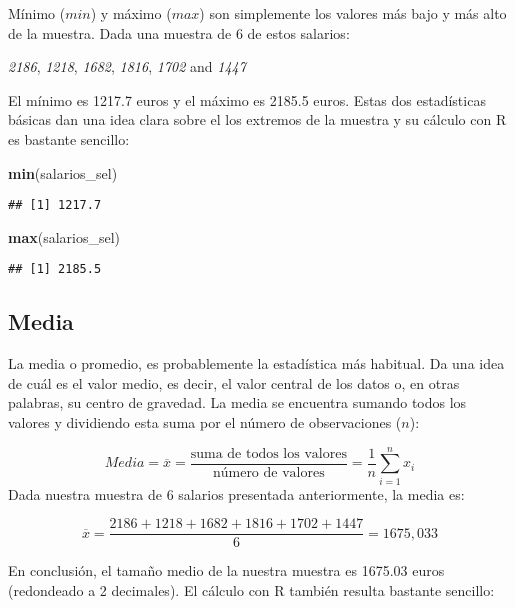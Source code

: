 \documentclass[
]{book}
\newenvironment{Shaded}{\begin{snugshade}}{\end{snugshade}}
\newcommand{\KeywordTok}[1]{\textcolor[rgb]{0.13,0.29,0.53}{\textbf{#1}}}
\newcommand{\NormalTok}[1]{#1}
\begin{document}
Mínimo (\(min\)) y máximo (\(max\)) son simplemente los valores más bajo y más alto de la muestra. Dada una muestra de 6 de estos salarios:

\emph{2186}, \emph{1218}, \emph{1682}, \emph{1816}, \emph{1702} and \emph{1447}

El mínimo es 1217.7 euros y el máximo es 2185.5 euros. Estas dos estadísticas básicas dan una idea clara sobre el los extremos de la muestra y su cálculo con R es bastante sencillo:

\begin{Shaded}
\begin{Highlighting}[]
\KeywordTok{min}\NormalTok{(salarios_sel)}
\end{Highlighting}
\end{Shaded}

\begin{verbatim}
## [1] 1217.7
\end{verbatim}

\begin{Shaded}
\begin{Highlighting}[]
\KeywordTok{max}\NormalTok{(salarios_sel)}
\end{Highlighting}
\end{Shaded}

\begin{verbatim}
## [1] 2185.5
\end{verbatim}

\hypertarget{media}{%
\subsection{Media}\label{media}}

La media o promedio, es probablemente la estadística más habitual. Da una idea de cuál es el valor medio, es decir, el valor central de los datos o, en otras palabras, su centro de gravedad. La media se encuentra sumando todos los valores y dividiendo esta suma por el número de observaciones (\(n\)):

\[Media =\overline{x}=\frac{\text{suma de todos los valores}}{\text{número de valores}} = \frac{1}{n}\sum^{n}_{i=1}x_i\]
Dada nuestra muestra de 6 salarios presentada anteriormente, la media es:

\[\overline{x} = \frac{2186 + 1218 + 1682 + 1816 + 1702 + 1447}{6}= 1675,033\]

En conclusión, el tamaño medio de la nuestra muestra es 1675.03 euros (redondeado a 2 decimales). El cálculo con R también resulta bastante sencillo:
\end{document}
